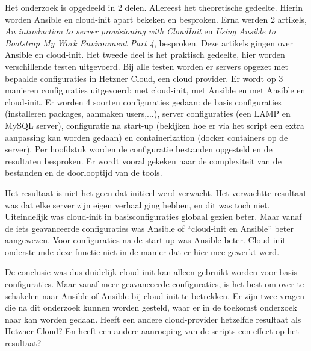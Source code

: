 Het onderzoek is opgedeeld in 2 delen. Allereest het theoretische gedeelte. Hierin worden Ansible en cloud-init apart bekeken en besproken. Erna werden 2 artikels, \textit{An introduction to server provisioning with CloudInit} en \textit{Using Ansible to Bootstrap My Work Environment Part 4}, besproken. Deze artikels gingen over Ansible en cloud-init. Het tweede deel is het praktisch gedeelte, hier worden verschillende testen uitgevoerd. Bij alle testen worden er servers opgezet met bepaalde configuraties in Hetzner Cloud, een cloud provider. Er wordt op 3 manieren configuraties uitgevoerd: met cloud-init, met Ansible en met Ansible en cloud-init.  Er worden 4 soorten configuraties gedaan: de basis configuraties (installeren packages, aanmaken users,...), server configuraties (een LAMP en MySQL server), configuratie na start-up (bekijken hoe er via het script een extra aanpassing kan worden gedaan) en containerization (docker containers op de server). Per hoofdstuk worden de configuratie bestanden opgesteld en de resultaten besproken. Er wordt vooral gekeken naar de complexiteit van de bestanden en de doorlooptijd van de tools.

\newpage
Het resultaat is niet het geen dat initieel werd verwacht. Het verwachtte resultaat was dat elke server zijn eigen verhaal ging hebben, en dit was toch niet. Uiteindelijk was cloud-init in basisconfiguraties globaal gezien beter. Maar vanaf de iets geavanceerde configuraties was Ansible of ``cloud-init en Ansible'' beter aangewezen. Voor configuraties na de start-up was Ansible beter. Cloud-init ondersteunde deze functie niet in de manier dat er hier mee gewerkt werd. 

De conclusie was dus duidelijk cloud-init kan alleen gebruikt worden voor basis configuraties. Maar vanaf meer geavanceerde configuraties, is het best om over te schakelen naar Ansible of Ansible bij cloud-init te betrekken. Er zijn twee vragen die na dit onderzoek kunnen worden gesteld, waar er in de toekomst onderzoek naar kan worden gedaan. Heeft een andere cloud-provider hetzelfde resultaat als Hetzner Cloud? En heeft een andere aanroeping van de scripts een effect op het resultaat?





